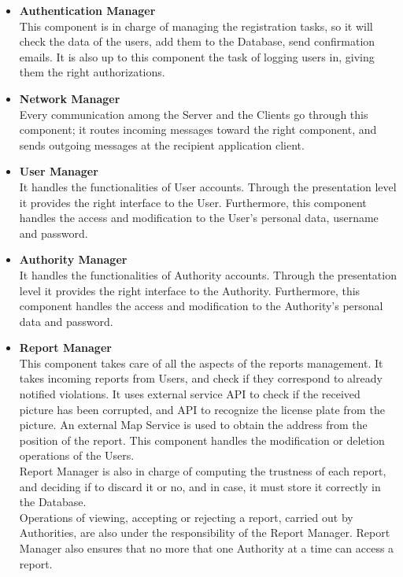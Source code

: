 \begin{itemize}
    \item \textbf{Authentication Manager}\\
    This component is in charge of managing the registration tasks, so it will check the data of the users, add them to the Database, send confirmation emails. It is also up to this component the task of logging users in, giving them the right authorizations.  
    
    \item \textbf{Network Manager}\\
    Every communication among the Server and the Clients go through this component; it routes incoming messages toward the right component, and sends outgoing messages at the recipient application client.
    
    \item\textbf{User Manager}\\
    It handles the functionalities of User accounts. Through the presentation level it provides the right interface to the User. Furthermore, this component handles the access and modification to the User's personal data, username and password. 
    
    
    \item\textbf{Authority Manager}\\
     It handles the functionalities of Authority accounts. Through the presentation level it provides the right interface to the Authority. Furthermore, this component handles the access and modification to the Authority's personal data and password. 
     
     \item \textbf{Report Manager}\\
     This component takes care of all the aspects of the reports management.
     It takes incoming reports from Users, and check if they correspond to already notified violations. It uses external service API to check if the received picture has been corrupted, and API to recognize the license plate from the picture. An external Map Service is used to obtain the address from the position of the report. This component handles the modification or deletion operations of the Users.\\
     Report Manager is also in charge of computing the trustness of each report, and deciding if to discard it or no, and in case, it must store it correctly in the Database.\\
     Operations of viewing, accepting or rejecting a report, carried out by Authorities, are also under the responsibility of the Report Manager.
     Report Manager also ensures that no more that one Authority at a time can access a report.
     

\end{itemize}
